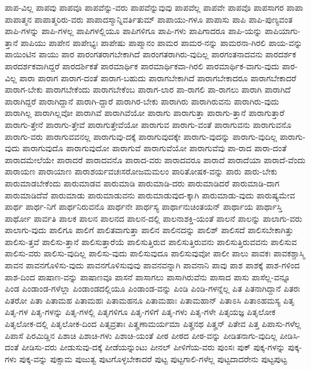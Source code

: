 {ಪಾಪ-ವಿಲ್ಲ
ಪಾಪವು
ಪಾಪವೂ
ಪಾಪವೆನ್ನು-ವರು
ಪಾಪವೆನ್ನುವುವು
ಪಾಪವೆಲ್ಲ
ಪಾಪವೇ
ಪಾಪವೊ
ಪಾಪಸಾಗರ
ಪಾಪಾ
ಪಾಪಾತ್ಮನ
ಪಾಪಾತ್ಮರಿರು-ವರು
ಪಾಪಾದಸ್ಮಾನ್ನಿವರ್ತಿತುಮ್
ಪಾಪಾಯು-ಗಳೂ
ಪಾಪಾಸು
ಪಾಪಿ
ಪಾಪಿ-ಪುಣ್ಯವಂತ
ಪಾಪಿ-ಗಳನ್ನು
ಪಾಪಿ-ಗಳಲ್ಲ
ಪಾಪಿಗಳಲ್ಲಿಯೂ
ಪಾಪಿಗಳಿಗೂ
ಪಾಪಿ-ಗಳು
ಪಾಪಿಗಾದರೂ
ಪಾಪಿ-ಯನ್ನು
ಪಾಪಿಯಾಗು-ತ್ತಾನೆ
ಪಾಪಿಯು
ಪಾಪೇನ
ಪಾಪೇಭ್ಯಃ
ಪಾಪೇಷು
ಪಾಪ್ಮಾನಂ
ಪಾಮರ
ಪಾಮರ-ನನ್ನು
ಪಾಮರನಾ-ಗಿರಲಿ
ಪಾಯ-ವನ್ನು
ಪಾಯಿಂಟಿನ
ಪಾಯು
ಪಾರ
ಪಾರಂಗತರಾಗಬೇಕಾಗಿದೆ
ಪಾರಂಗತರಾಗಿರು-ವುದಿಲ್ಲ
ಪಾರಗಂತನಾದವನು
ಪಾರದರ್ಶಕ
ಪಾರದರ್ಶಕವಾಗಿದ್ದರೆ
ಪಾರದರ್ಶಿಕತೆ
ಪಾರಮಾರ್ಥಿಕ
ಪಾರಮಾರ್ಥಿಕವಾ-ಗಿರಲಿ
ಪಾರಮಾರ್ಥಿಕ-ವಾಗು-ವುದು
ಪಾರ-ವಿಲ್ಲ
ಪಾರಾ
ಪಾರಾಗ
ಪಾರಾಗ-ದಂತೆ
ಪಾರಾಗ-ಬಹುದು
ಪಾರಾಗಬೇಕಾಗಿದೆ
ಪಾರಾಗಬೇಕಾದರೂ
ಪಾರಾಗಬೇಕಾದರೆ
ಪಾರಾಗ-ಬೇಕು
ಪಾರಾಗಬೇಕೆಂದು
ಪಾರಾಗಬೇಕೆಂಬ
ಪಾರಾಗ-ಲಾರ
ಪಾ-ರಾಗಲಿ
ಪಾ-ರಾಗಲು
ಪಾರಾಗಿ
ಪಾರಾಗಿದೆ
ಪಾರಾಗಿದ್ದರೆ
ಪಾರಾಗಿದ್ದಾನೆ
ಪಾರಾಗಿ-ದ್ದಾರೆ
ಪಾರಾಗಿರ-ಬೇಕು
ಪಾರಾಗಿರು
ಪಾರಾಗಿರುವನು
ಪಾರಾಗಿರು-ವುದು
ಪಾರಾಗಿಲ್ಲ
ಪಾರಾಗಿಲ್ಲವೋ
ಪಾರಾಗಿವೆ
ಪಾರಾಗಿವೆಯೋ
ಪಾರಾಗು
ಪಾರಾಗುತ್ತಾ
ಪಾರಾಗು-ತ್ತಾನೆ
ಪಾರಾಗುತ್ತಾರೆ
ಪಾರಾಗು-ತ್ತೇನೆ
ಪಾರಾಗು-ತ್ತೇವೆ
ಪಾರಾಗುತ್ತೇವೆಯೋ
ಪಾರಾಗುವ
ಪಾರಾಗು-ವಂತೆ
ಪಾರಾಗುವನು
ಪಾರಾಗುವನೊ
ಪಾರಾಗು-ವರು
ಪಾರಾಗುವವನಲ್ಲ
ಪಾರಾಗುವು-ದಕ್ಕೆ
ಪಾರಾಗುವುದಕ್ಕೇ
ಪಾರಾಗು-ವುದನ್ನು
ಪಾರಾಗು-ವುದಿಲ್ಲ
ಪಾರಾಗು-ವುದು
ಪಾರಾಗುವುದೊ
ಪಾರಾಗುವುದೋ
ಪಾರಾಗುವೆ
ಪಾರಾಗುವೆಯೋ
ಪಾರಾಗುವೆವು
ಪಾ-ರಾದ
ಪಾರಾ-ದಂತೆ
ಪಾರಾದಮೇಲೆಯೇ
ಪಾರಾದರೆ
ಪಾರಾದವನೊ
ಪಾರಾದ-ವರು
ಪಾರಾದವರೂ
ಪಾರಾದೆ
ಪಾರಾದೆಯಾ
ಪಾರಾದೆ-ವೆಂದು
ಪಾರಾಯಣ
ಪಾರಾಯಾಣ
ಪಾರಾಶರ್ಯವಚಃಸರೋಜಮಮಲಂ
ಪಾರಿತೋಷಕ-ವನ್ನು
ಪಾರು
ಪಾರು-ಬೇಕು
ಪಾರುಮಾಡಬೇಕೆಂದು
ಪಾರುಮಾಡವ
ಪಾರುಮಾಡಿ
ಪಾರುಮಾಡಿ-ದರು
ಪಾರುಮಾಡಿದರೆ
ಪಾರುಮಾಡಿ-ದಾಗ
ಪಾರುಮಾಡಿದೆವೆ
ಪಾರುಮಾಡು
ಪಾರುಮಾಡುವನು
ಪಾರುಮಾಡುವುದ-ಕ್ಕಾಗಿ
ಪಾರುಮಾಡು-ವುದು
ಪಾರುಷ್ಯಮೇವ
ಪಾರ್ಥ
ಪಾರ್ಥ-ನಿಗೆ
ಪಾರ್ಥನಿರುವನೊ
ಪಾರ್ಥನೇ
ಪಾರ್ಥಸ್ಯ
ಪಾರ್ಥಾನುಚಿಂತಯನ್
ಪಾರ್ಥಾಯ
ಪಾರ್ಥಾಸ್ತಿ
ಪಾರ್ಥೋ
ಪಾರ್ವತಿ
ಪಾಲಕ
ಪಾಲನ
ಪಾಲನದ
ಪಾಲನ-ದಲ್ಲಿ
ಪಾಲನಾಶಕ್ತಿ-ಯಂತೆ
ಪಾಲನೆ
ಪಾಲನ್ನು
ಪಾಲಾಗು-ವರು
ಪಾಲಾಗು-ವುದು
ಪಾಲಿಗೂ
ಪಾಲಿಗೆ
ಪಾಲಿತವಾಗುತ್ತಾ
ಪಾಲಿನ
ಪಾಲಿನದನ್ನು
ಪಾಲಿಶ್
ಪಾಲಿಸದೆ
ಪಾಲಿಸಬೇಕಾಗಿತ್ತು
ಪಾಲಿಸು-ತ್ತವೆ
ಪಾಲಿಸು-ತ್ತಾನೆ
ಪಾಲಿಸುತ್ತಾರೆಯೆ
ಪಾಲಿಸುತ್ತಿರುವ
ಪಾಲಿಸುತ್ತಿರುವನು
ಪಾಲಿಸುತ್ತಿರುವವನು
ಪಾಲಿಸುವ
ಪಾಲಿಸು-ವರು
ಪಾಲಿಸು-ವುದಿಲ್ಲ
ಪಾಲಿಸು-ವುದು
ಪಾಲಿಸುವುದೂ
ಪಾಲಿಸುವುವೋ
ಪಾಲೀ
ಪಾಲು
ಪಾವಕಃ
ಪಾವಕಶ್ಚಾಸ್ಮಿ
ಪಾವನ
ಪಾವನಗೊಳಿಸು-ವುದು
ಪಾವನಗೊಳಿಸುವುವು
ಪಾವನವನ್ನಾಗಿ
ಪಾವನಾನಿ
ಪಾವು
ಪಾಶ
ಪಾಶಕ್ಕೆ
ಪಾಶ-ಗಳಿಂದ
ಪಾಶ-ದಿಂದ
ಪಾಷಾಣ-ವನ್ನು
ಪಾಷಾಣವೂ
ಪಾಸನೆ
ಪಾಸಾಗಲು
ಪಾಸಾಗಿರುವೆನು
ಪಾಸಾದ
ಪಾಸು
ಪಾಸೆಲ್ಲ-ವನ್ನೂ
ಪಿಂಡ
ಪಿಂಡಾಂಡ-ಗಳೆಲ್ಲಾ
ಪಿಂಡಾಂಡದಲ್ಲಿಯೂ
ಪಿಂಡಾಂಡ-ವನ್ನು
ಪಿಂಡಿ
ಪಿಂಡಿ-ಗಳನ್ನೆಲ್ಲ
ಪಿತ
ಪಿತನಾಗಿದ್ದಾನೆ
ಪಿತರಃ
ಪಿತರೋ
ಪಿತಾ
ಪಿತಾಮಹ
ಪಿತಾಮಹಃ
ಪಿತಾಮಹನೂ
ಪಿತಾಮಹಾಃ
ಪಿತಾಮಹಾನ್
ಪಿತಾಽಸಿ
ಪಿತಾಽಹಮಸ್ಯ
ಪಿತೃ
ಪಿತೃ-ಗಳ
ಪಿತೃ-ಗಳನ್ನು
ಪಿತೃ-ಗಳಲ್ಲಿ
ಪಿತೃಗಳಿಗೂ
ಪಿತೃ-ಗಳಿಗೆ
ಪಿತೃ-ಗಳು
ಪಿತೃ-ಗಳೇ
ಪಿತೃಯಜ್ಞ
ಪಿತೃಲೋಕ
ಪಿತೃಲೋಕ-ದಲ್ಲಿ
ಪಿತೃಲೋಕ-ದಿಂದ
ಪಿತೃವ್ರತಾಃ
ಪಿತೄಣಾಮರ್ಯಮಾ
ಪಿತೄನಥ
ಪಿತೄನ್
ಪಿತೇವ
ಪಿತ್ತ
ಪಿಪಾಸು-ಗಳೆಲ್ಲ
ಪಿಪಾಸೆ
ಪಿರಮಿಡ್ಡಿನ
ಪಿಶಾಚಿ
ಪಿಶಾಚಿ-ಗಳು
ಪಿಶಾಚಿ-ಯಂತೆ
ಪೀಠ
ಪೀಠದ
ಪೀಠ-ವನ್ನು
ಪೀಡಿತನಾಗು-ವುದಿಲ್ಲ
ಪೀಡಿಸಿ-ದಂತೆ
ಪೀಡಿಸು-ವರು
ಪೀಡುಸುವು-ದಕ್ಕೆ
ಪೀಡೆಯನ್ನುಂಟು
ಪೀನಲ್
ಪೀಳಿಗೆಯ-ವರು
ಪುಂಸಃ
ಪುಕ್
ಪುಕ್ಕ-ಗಳನ್ನು
ಪುಕ್ಕ-ಗಳು
ಪುಕ್ಕ-ವನ್ನು
ಪುಕ್ಸಾಮ
ಪುಜುತ್ವ
ಪುಟಗೊಳ್ಳಬೇಕಾದರೆ
ಪುಟ್ಟ
ಪುಟ್ಟಗಾಲಿ-ಗಳೆಲ್ಲ
ಪುಟ್ಟದಾದರೇನು
ಪುಟ್ಟಪುಟ್ಟ
}
